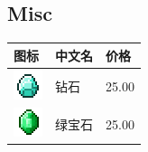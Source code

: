 \documentclass[UTF8]{ctexart}
\begin{document}
\subsection{Misc}
\begin{longtable}[]{|p{1cm}|p{8cm}|p{1.5cm}|}
\toprule
图标 & 中文名 & 价格\\
\midrule
	\includegraphics{.workspace/icons/minecraft/minecraft__diamond__0.png} & 钻石 &25.00\\
	\hline
	\includegraphics{.workspace/icons/minecraft/minecraft__emerald__0.png} & 绿宝石 &25.00\\
	\hline

\end{longtable}
\end{document}
